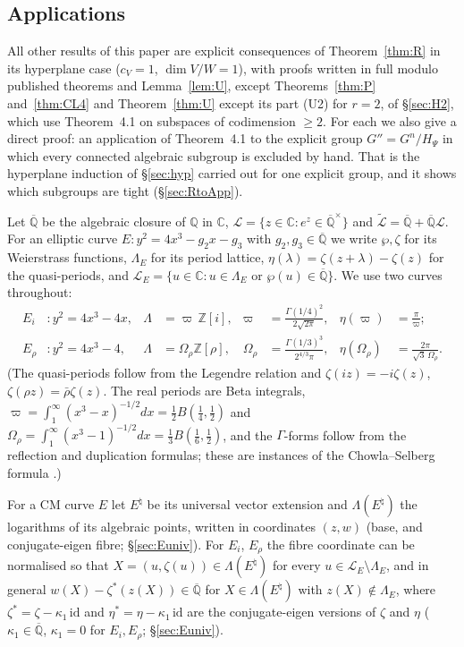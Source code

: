 \documentclass[11pt]{amsart}
\theoremstyle{definition}
\newcommand{\Qb}{\overline{\mathbb{Q}}}
\newcommand{\C}{\mathbb{C}}
\newcommand{\Q}{\mathbb{Q}}
\newcommand{\Z}{\mathbb{Z}}
\newcommand{\Lg}{\mathcal{L}}
\newcommand{\Lt}{\widetilde{\mathcal{L}}}
\newcommand{\vp}{\varpi}
\begin{document}
\subsection*{Applications}
All other results of this paper are explicit consequences of Theorem~\ref{thm:R} in its hyperplane case ($c_V=1$,
$\dim V/W=1$), with proofs written in full modulo published theorems and Lemma~\ref{lem:U}, except Theorems~\ref{thm:P}
and~\ref{thm:CL4} and Theorem~\ref{thm:U} except its part (U2) for $r=2$, of \S\ref{sec:H2}, which use Theorem~4.1 on
subspaces of codimension $\ge2$. For
each we also give a direct proof: an application of Theorem~4.1 to the explicit group $G''=G^n/H_\Psi$ in which every
connected algebraic subgroup is excluded by hand. That is the hyperplane induction of \S\ref{sec:hyp} carried out for one
explicit group, and it shows which subgroups are tight (\S\ref{sec:RtoApp}).

Let $\Qb$ be the algebraic closure of $\Q$ in $\C$, $\Lg=\{z\in\C: e^z\in\Qb^\times\}$ and $\Lt=\Qb+\Qb\Lg$. For an
elliptic curve $E\colon y^2=4x^3-g_2x-g_3$ with $g_2,g_3\in\Qb$ we write $\wp,\zeta$ for its Weierstrass functions,
$\Lambda_E$ for its period lattice, $\eta(\lambda)=\zeta(z+\lambda)-\zeta(z)$ for the quasi-periods, and
$\Lg_E=\{u\in\C: u\in\Lambda_E \text{ or } \wp(u)\in\Qb\}$. We use two curves throughout:
\begin{align*}
E_i&\colon y^2=4x^3-4x, & \Lambda&=\vp\,\Z[i], & \vp&=\tfrac{\Gamma(1/4)^2}{2\sqrt{2\pi}}, & \eta(\vp)&=\tfrac{\pi}{\vp};\\
E_\rho&\colon y^2=4x^3-4, & \Lambda&=\Omega_\rho\Z[\rho], & \Omega_\rho&=\tfrac{\Gamma(1/3)^3}{2^{4/3}\pi}, & \eta(\Omega_\rho)&=\tfrac{2\pi}{\sqrt3\,\Omega_\rho}.
\end{align*}
(The quasi-periods follow from the Legendre relation and $\zeta(iz)=-i\zeta(z)$, $\zeta(\rho z)=\bar\rho\zeta(z)$. The real
periods are Beta integrals, $\vp=\int_1^\infty(x^3-x)^{-1/2}dx=\tfrac12B(\tfrac14,\tfrac12)$ and
$\Omega_\rho=\int_1^\infty(x^3-1)^{-1/2}dx=\tfrac13B(\tfrac16,\tfrac12)$, and the $\Gamma$-forms follow from the reflection and
duplication formulas; these are instances of the Chowla--Selberg formula \cite{Gr78}.)

For a CM curve $E$ let $E^\natural$ be its universal vector extension and $\Lambda(E^\natural)$ the logarithms of its
algebraic points, written in coordinates $(z,w)$ (base, and conjugate-eigen fibre; \S\ref{sec:Euniv}). For $E_i$, $E_\rho$
the fibre coordinate can be normalised so that $X=(u,\zeta(u))\in\Lambda(E^\natural)$ for every $u\in\Lg_E\setminus\Lambda_E$,
and in general $w(X)-\zeta^*(z(X))\in\Qb$ for $X\in\Lambda(E^\natural)$ with $z(X)\notin\Lambda_E$, where
$\zeta^*=\zeta-\kappa_1\,\mathrm{id}$ and $\eta^*=\eta-\kappa_1\,\mathrm{id}$ are the conjugate-eigen versions of $\zeta$ and $\eta$
($\kappa_1\in\Qb$, $\kappa_1=0$ for $E_i,E_\rho$; \S\ref{sec:Euniv}).
\end{document}
